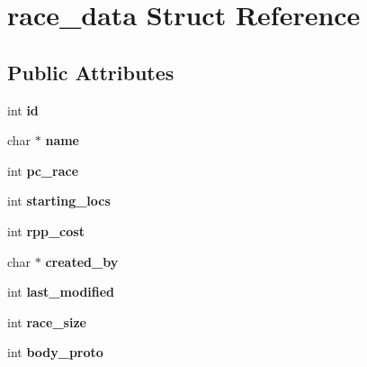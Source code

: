 \hypertarget{structrace__data}{\section{race\-\_\-data Struct Reference}
\label{structrace__data}
}
\subsection*{Public Attributes}
\begin{DoxyCompactItemize}
\item 
\hypertarget{structrace__data_a6f8c072a841aab63306a3d4fc0905542}{int {\bfseries id}}\label{structrace__data_a6f8c072a841aab63306a3d4fc0905542}

\item 
\hypertarget{structrace__data_a917de6deb778c230eff5d8444f8ed7aa}{char $\ast$ {\bfseries name}}\label{structrace__data_a917de6deb778c230eff5d8444f8ed7aa}

\item 
\hypertarget{structrace__data_a0dfa2673807e01a373cbe39a618700a8}{int {\bfseries pc\-\_\-race}}\label{structrace__data_a0dfa2673807e01a373cbe39a618700a8}

\item 
\hypertarget{structrace__data_ab225f9d9aa6815e5d0428bb4ab900bee}{int {\bfseries starting\-\_\-locs}}\label{structrace__data_ab225f9d9aa6815e5d0428bb4ab900bee}

\item 
\hypertarget{structrace__data_a01615fc10681149548276b22fa437349}{int {\bfseries rpp\-\_\-cost}}\label{structrace__data_a01615fc10681149548276b22fa437349}

\item 
\hypertarget{structrace__data_a8dcff32c7f876f3967f63113e18838da}{char $\ast$ {\bfseries created\-\_\-by}}\label{structrace__data_a8dcff32c7f876f3967f63113e18838da}

\item 
\hypertarget{structrace__data_a787cb7f6d8c8670b5f379e87a758f570}{int {\bfseries last\-\_\-modified}}\label{structrace__data_a787cb7f6d8c8670b5f379e87a758f570}

\item 
\hypertarget{structrace__data_a4e9ed7416fc29fe311de8a71a22c6542}{int {\bfseries race\-\_\-size}}\label{structrace__data_a4e9ed7416fc29fe311de8a71a22c6542}

\item 
\hypertarget{structrace__data_ad6be4549afc53e13750bb97785c41e1e}{int {\bfseries body\-\_\-proto}}\label{structrace__data_ad6be4549afc53e13750bb97785c41e1e}


\end{DoxyCompactItemize}
